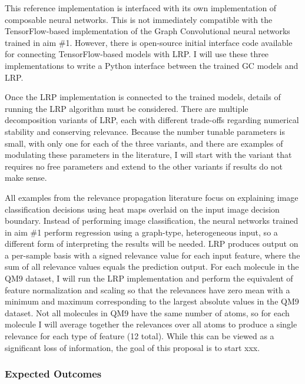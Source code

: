 \documentclass[12pt]{article}
\begin{document}
This reference implementation is interfaced with its own implementation of composable neural networks. This is not immediately compatible with the TensorFlow-based implementation of the Graph Convolutional neural networks trained in aim \#1. However, there is open-source initial interface code available for connecting TensorFlow-based models with LRP\cite{github:lrp_tf,github:lrp_tf2}. I will use these three implementations to write a Python interface between the trained GC models and LRP.

Once the LRP implementation is connected to the trained models, details of running the LRP algorithm must be considered. There are multiple decomposition variants of LRP, each with different trade-offs regarding numerical stability and conserving relevance\cite{Binder2016}. Because the number tunable parameters is small, with only one for each of the three variants, and there are examples of modulating these parameters in the literature, I will start with the variant that requires no free parameters and extend to the other variants if results do not make sense.

All examples from the relevance propagation literature focus on explaining image classification decisions using heat maps overlaid on the input image decision boundary. Instead of performing image classification, the neural networks trained in aim \#1 perform regression using a graph-type, heterogeneous input, so a different form of interpreting the results will be needed. LRP produces output on a per-sample basis with a signed relevance value for each input feature, where the sum of all relevance values equals the prediction output. For each molecule in the QM9 dataset, I will run the LRP implementation and perform the equivalent of feature normalization and scaling so that the relevances have zero mean with a minimum and maximum corresponding to the largest absolute values in the QM9 dataset. Not all molecules in QM9 have the same number of atoms, so for each molecule I will average together the relevances over all atoms to produce a single relevance for each type of feature (12 total). While this can be viewed as a significant loss of information, the goal of this proposal is to start xxx.


\subsubsection{Expected Outcomes}
\label{sec:org2c67d7e}
\end{document}
